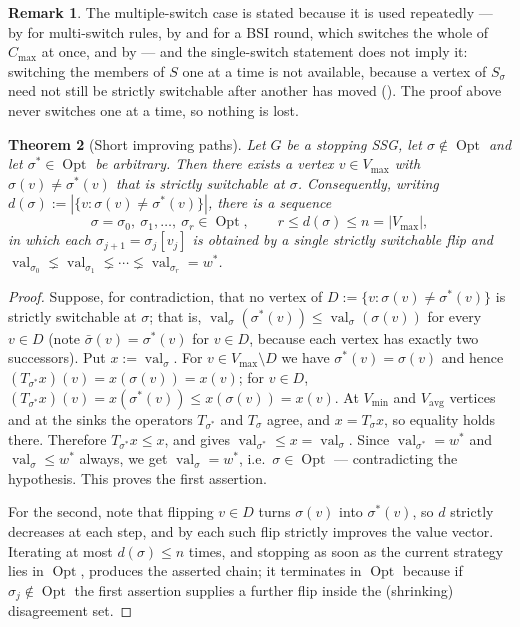 \documentclass[11pt]{article}
\theoremstyle{plain}
\newtheorem{theorem}{Theorem}[section]
\theoremstyle{definition}
\newtheorem{remark}[theorem]{Remark}
\DeclareMathOperator{\val}{val}
\DeclareMathOperator{\Opt}{Opt}
\newcommand{\Vmax}{V_{\max}}
\newcommand{\Vmin}{V_{\min}}
\newcommand{\Vavg}{V_{\mathrm{avg}}}
\begin{document}
\begin{remark}
The multiple-switch case is stated because it is used repeatedly ---
by  for multi-switch rules, by
 and  for a BSI round, which
switches the whole of $C_{\max}$ at once, and by
 --- and the single-switch statement does
not imply it: switching the members of $S$ one at a time is not available,
because a vertex of $S_\sigma$ need not still be strictly switchable after
another has moved (). The proof above never
switches one at a time, so nothing is lost.
\end{remark}

\begin{theorem}[Short improving paths]\label{thm:short-path}
Let $G$ be a stopping SSG, let $\sigma\notin\Opt$ and let
$\sigma^\ast\in\Opt$ be arbitrary. Then there exists a vertex
$v\in\Vmax$ with $\sigma(v)\ne\sigma^\ast(v)$ that is strictly
switchable at $\sigma$. Consequently, writing
$d(\sigma):=|\{v:\sigma(v)\ne\sigma^\ast(v)\}|$, there is a sequence
\[
  \sigma=\sigma_0,\ \sigma_1,\dots,\ \sigma_r\in\Opt,
  \qquad r\le d(\sigma)\le n=|\Vmax|,
\]
in which each $\sigma_{j+1}=\sigma_j[v_j]$ is obtained by a single
strictly switchable flip and $\val_{\sigma_0}\lneq\val_{\sigma_1}\lneq\cdots\lneq\val_{\sigma_r}=w^\ast$.
\end{theorem}

\begin{proof}
Suppose, for contradiction, that no vertex of
$D:=\{v:\sigma(v)\ne\sigma^\ast(v)\}$ is strictly switchable at $\sigma$;
that is, $\val_\sigma(\sigma^\ast(v))\le\val_\sigma(\sigma(v))$ for every
$v\in D$ (note $\bar\sigma(v)=\sigma^\ast(v)$ for $v\in D$, because each
vertex has exactly two successors). Put $x:=\val_\sigma$. For
$v\in\Vmax\setminus D$ we have $\sigma^\ast(v)=\sigma(v)$ and hence
$(T_{\sigma^\ast}x)(v)=x(\sigma(v))=x(v)$; for $v\in D$,
$(T_{\sigma^\ast}x)(v)=x(\sigma^\ast(v))\le x(\sigma(v))=x(v)$. At
$\Vmin$ and $\Vavg$ vertices and at the sinks the operators
$T_{\sigma^\ast}$ and $T_\sigma$ agree, and $x=T_\sigma x$, so equality
holds there. Therefore $T_{\sigma^\ast}x\le x$, and 
gives $\val_{\sigma^\ast}\le x=\val_\sigma$. Since
$\val_{\sigma^\ast}=w^\ast$ and $\val_\sigma\le w^\ast$ always, we get
$\val_\sigma=w^\ast$, i.e.\ $\sigma\in\Opt$ --- contradicting the
hypothesis. This proves the first assertion.

For the second, note that flipping $v\in D$ turns $\sigma(v)$ into
$\sigma^\ast(v)$, so $d$ strictly decreases at each step, and by
 each such flip strictly improves the value vector.
Iterating at most
$d(\sigma)\le n$ times, and stopping as soon as the current strategy lies
in $\Opt$, produces the asserted chain; it terminates in $\Opt$ because
if $\sigma_j\notin\Opt$ the first assertion supplies a further flip
inside the (shrinking) disagreement set.
\end{proof}
\end{document}
